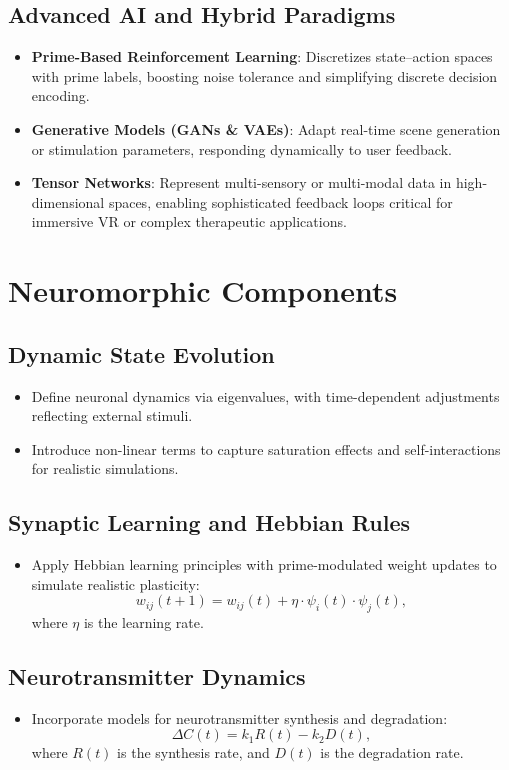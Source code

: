 \documentclass{article}
\theoremstyle{plain}
\begin{document}
\subsection{Advanced AI and Hybrid Paradigms}
\begin{itemize}
    \item \textbf{Prime-Based Reinforcement Learning}: Discretizes state–action spaces with prime labels, boosting noise tolerance and simplifying discrete decision encoding.
    \item \textbf{Generative Models (GANs \& VAEs)}: Adapt real-time scene generation or stimulation parameters, responding dynamically to user feedback.
    \item \textbf{Tensor Networks}: Represent multi-sensory or multi-modal data in high-dimensional spaces, enabling sophisticated feedback loops critical for immersive VR or complex therapeutic applications.
\end{itemize}

\section{Neuromorphic Components}

\subsection{Dynamic State Evolution}
\begin{itemize}
    \item Define neuronal dynamics via eigenvalues, with time-dependent adjustments reflecting external stimuli.
    \item Introduce non-linear terms to capture saturation effects and self-interactions for realistic simulations.
\end{itemize}

\subsection{Synaptic Learning and Hebbian Rules}
\begin{itemize}
    \item Apply Hebbian learning principles with prime-modulated weight updates to simulate realistic plasticity:
    \[
    w_{ij}(t+1) = w_{ij}(t) + \eta \cdot \psi_i(t) \cdot \psi_j(t),
    \]
    where \(\eta\) is the learning rate.
\end{itemize}

\subsection{Neurotransmitter Dynamics}
\begin{itemize}
    \item Incorporate models for neurotransmitter synthesis and degradation:
    \[
    \Delta C(t) = k_1 R(t) - k_2 D(t),
    \]
    where \(R(t)\) is the synthesis rate, and \(D(t)\) is the degradation rate.
\end{itemize}
\end{document}
